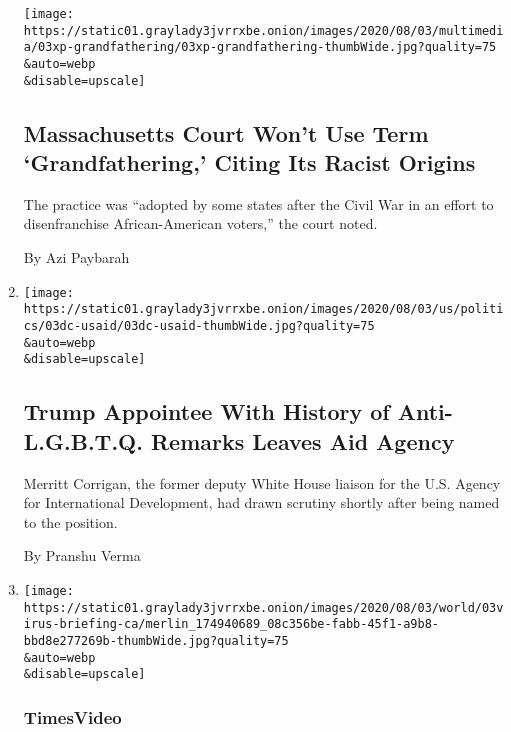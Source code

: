 \begin{enumerate}
  \texttt{[image: https://static01.graylady3jvrrxbe.onion/images/2020/08/03/multimedia/03xp-grandfathering/03xp-grandfathering-thumbWide.jpg?quality=75\\\&auto=webp\\\&disable=upscale]}

  \hypertarget{massachusetts-court-wont-use-term-grandfathering-citing-its-racist-origins}{%
  \subsection{Massachusetts Court Won't Use Term `Grandfathering,'
  Citing Its Racist
  Origins}\label{massachusetts-court-wont-use-term-grandfathering-citing-its-racist-origins}}

  The practice was ``adopted by some states after the Civil War in an
  effort to disenfranchise African-American voters,'' the court noted.

  By Azi Paybarah
\item
  \href{/2020/08/03/us/politics/merritt-corrigan-usaid.html}{}

  \texttt{[image: https://static01.graylady3jvrrxbe.onion/images/2020/08/03/us/politics/03dc-usaid/03dc-usaid-thumbWide.jpg?quality=75\\\&auto=webp\\\&disable=upscale]}

  \hypertarget{trump-appointee-with-history-of-anti-lgbtq-remarks-leaves-aid-agency}{%
  \subsection{Trump Appointee With History of Anti-L.G.B.T.Q. Remarks
  Leaves Aid
  Agency}\label{trump-appointee-with-history-of-anti-lgbtq-remarks-leaves-aid-agency}}

  Merritt Corrigan, the former deputy White House liaison for the U.S.
  Agency for International Development, had drawn scrutiny shortly after
  being named to the position.

  By Pranshu Verma
\item
  \href{/video/us/100000007271181/california-virus-cases-trend-down.html}{}

  \texttt{[image: https://static01.graylady3jvrrxbe.onion/images/2020/08/03/world/03virus-briefing-ca/merlin\_174940689\_08c356be-fabb-45f1-a9b8-bbd8e277269b-thumbWide.jpg?quality=75\\\&auto=webp\\\&disable=upscale]}

  \hypertarget{timesvideo}{%
  \subsubsection{TimesVideo}\label{timesvideo}}


\end{enumerate}
